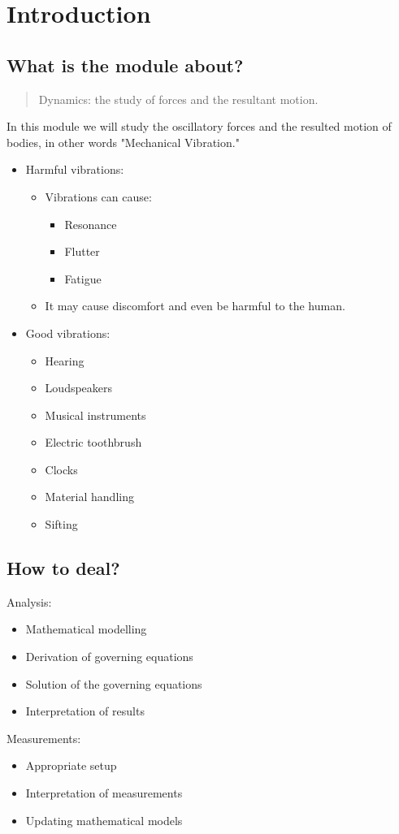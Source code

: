 \documentclass[class=report, crop=false, 12pt,a4paper]{standalone}
\begin{document}
\section{Introduction}
\subsection{What is the module about?}
\begin{quotation}
    Dynamics: the study of forces and the resultant motion.
\end{quotation}
In this module we will study the oscillatory forces and the resulted motion of bodies, in other words "Mechanical Vibration."
\begin{itemize}
    \item Harmful vibrations:
    \begin{itemize}
        \item Vibrations can cause:
        \begin{itemize}
            \item Resonance
            \item Flutter
            \item Fatigue
        \end{itemize}
        \item It may cause discomfort and even be harmful to the human.
    \end{itemize}
    \item Good vibrations:
    \begin{itemize}
        \item Hearing
        \item Loudspeakers
        \item Musical instruments
        \item Electric toothbrush
        \item Clocks
        \item Material handling
        \item Sifting
    \end{itemize}
\end{itemize}
\subsection{How to deal?}
Analysis:
\begin{itemize}
    \item Mathematical modelling
    \item Derivation of governing equations
    \item Solution of the governing equations
    \item Interpretation of results
\end{itemize}
Measurements:
\begin{itemize}
    \item Appropriate setup
    \item Interpretation of measurements
    \item Updating mathematical models
\end{itemize}
\end{document}
